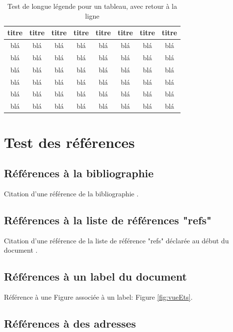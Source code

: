 \documentclass[letterpaper%
, twoside%
, 12pt%
,these%
,french
,creativecommons,hyperref,withAlgo2e%
]{thETS}
\begin{document}
\begin{table}
\centering
		\parbox{0.65\textwidth}{\caption{Test de longue légende pour un tableau, avec retour à la ligne}} %
		\begin{tabular}{|c|c|c|c|c|c|c|c|}
		\hline
			{\bf titre} & {\bf titre} & {\bf titre} & {\bf titre} & {\bf titre} & {\bf titre} & {\bf titre} & {\bf titre} \\
	  \hline
			blá & blá & blá & blá & blá & blá & blá & blá \\
	  \hline
			blá & blá & blá & blá & blá & blá & blá & blá \\
	  \hline
			blá & blá & blá & blá & blá & blá & blá & blá \\
	  \hline
			blá & blá & blá & blá & blá & blá & blá & blá \\
	  \hline
			blá & blá & blá & blá & blá & blá & blá & blá \\
	  \hline
			blá & blá & blá & blá & blá & blá & blá & blá \\
	  \hline
		\end{tabular}
\end{table}


\section{Test des références}

\subsection{Références à la bibliographie}

Citation d'une référence de la bibliographie \citep{BookExample}.

\subsection{Références à la liste de références "refs"}

Citation d'une référence de la liste de référence "refs" déclarée au début du document .

\subsection{Références à un label du document}

Référence à une Figure associée à un label: Figure \ref{fig:vueEts}.

\subsection{Références à des adresses}
\end{document}
